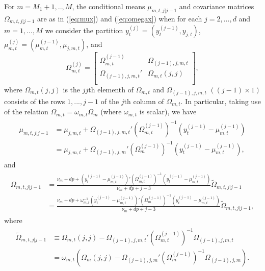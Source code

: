 \documentclass[nojss]{jss}
\begin{document}
\begin{appendix}
For $m=M_1+1,..,M$, the conditional means $\mu_{m,t,j|j-1}$ and covariance matrices $\Omega_{m,t,j|j-1}$ are as in (\ref{eq:mux}) and (\ref{eq:omegax}) when for each $j=2,...,d$ and $m=1,...,M$ we consider the partition $y_t^{(j)}=(y_t^{(j-1)},y_{j,t})$, $\mu_{m,t}^{(j)}=(\mu_{m,t}^{(j-1)},\mu_{j,m,t})$, and
\begin{equation}
\Omega_{m,t}^{(j)}=
\begin{bmatrix}
\Omega_{m,t}^{(j-1)} \quad\enspace & \Omega_{(j-1),j,m,t} \\
\Omega_{(j-1),j,m,t}' & \Omega_{m,t}(j,j)  \\
\end{bmatrix},
\end{equation}
where $\Omega_{m,t}(j,j)$ is the $jj$th elementh of $\Omega_{m,t}$ and $\Omega_{(j-1),j,m,t}$ $((j-1)\times 1)$  consists of the rows $1,...,j-1$ of the $j$th column of $\Omega_{m,t}$.  In particular,  taking use of the relation $\Omega_{m,t}=\omega_{m,t}\Omega_m$ (where $\omega_{m,t}$ is scalar), we have
\begin{align}
\begin{aligned}
\mu_{m,t,j|j-1} &=\mu_{j,m,t} + \Omega_{(j-1),j,m,t}'(\Omega_{m,t}^{(j-1)})^{-1}(y_t^{(j-1)}-\mu_{m,t}^{(j-1)})\\
&=\mu_{j,m,t} + \Omega_{(j-1),j,m}'(\Omega_{m}^{(j-1)})^{-1}(y_t^{(j-1)}-\mu_{m,t}^{(j-1)}),
\end{aligned}\label{eq:cond_mu_mtj}
\end{align}
and
\begin{align}
\begin{aligned}
\Omega_{m,t,j|j-1} &= \frac{\nu_m + dp + (y_t^{(j-1)} - \mu_{m,t}^{(j - 1)})'(\Omega_{m,t}^{(j-1)})^{-1}(y_t^{(j-1)} - \mu_{m,t}^{(j - 1)})}{\nu_m + dp + j - 3}\tilde{\Omega}_{m,t,j|j-1}\\
&= \frac{\nu_m + dp + \omega_{m,t}^{-1}(y_t^{(j-1)} - \mu_{m,t}^{(j - 1)})'(\Omega_{m}^{(j-1)})^{-1}(y_t^{(j-1)} - \mu_{m,t}^{(j - 1)})}{\nu_m + dp + j - 3}\tilde{\Omega}_{m,t,j|j-1},
\end{aligned}\label{eq:cond_omega_mtj}
\end{align}
where
\begin{align}
\begin{aligned}
\tilde{\Omega}_{m,t,j|j-1} &\equiv \Omega_{m,t}(j,j) - \Omega_{(j-1),j,m,t}'(\Omega_{m,t}^{(j-1)})^{-1} \Omega_{(j-1),j,m,t}\\
&=\omega_{m,t}(\Omega_{m}(j,j) - \Omega_{(j-1),j,m}'(\Omega_{m}^{(j-1)})^{-1} \Omega_{(j-1),j,m}).
\end{aligned}
\end{align}


\end{appendix}
\end{document}
